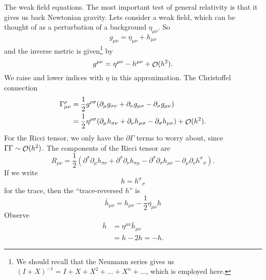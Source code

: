 
The weak field equations. The most important test of general
relativity is that it gives us back Newtonian gravity. Lets
consider a weak field, which can be thought of as a perturbation
of a background $\eta_{\mu\nu}$. So
\begin{equation}
g_{\mu\nu}=\eta_{\mu\nu}+h_{\mu\nu}
\end{equation}
and the inverse metric is given\footnote{We should recall that
  the Neumann series gives us
  $(I+X)^{-1}=I+X+X^{2}+\dots+X^{n}+\dots$, which is employed here.} by
\begin{equation}
g^{\mu\nu}=\eta^{\mu\nu}-h^{\mu\nu}+\mathop{\mathcal{O}}\nolimits(h^{2}).
\end{equation}
We raise and lower indices with $\eta$ in this approximation. The
Christoffel connection
\begin{equation}
\begin{split}
\Gamma^{\rho}_{\mu\nu}
&=\frac{1}{2}g^{\rho\sigma}(\partial_{\mu}g_{\sigma\nu}
+\partial_{\nu}g_{\mu\sigma}-\partial_{\sigma}g_{\mu\nu})\\
&=\frac{1}{2}\eta^{\rho\sigma}(\partial_{\mu}h_{\sigma\nu}
+\partial_{\nu}h_{\mu\sigma}-\partial_{\sigma}h_{\mu\nu})
+\mathop{\mathcal{O}}\nolimits(h^{2}).
\end{split}
\end{equation}
For the Ricci tensor, we only have the $\partial\Gamma$ terms to
worry about, since $\Gamma\Gamma\sim\mathop{\mathcal{O}}\nolimits(h^{2})$. The components
of the Ricci tensor are
\begin{equation}
R_{\mu\nu}=\frac{1}{2}(\partial^{\sigma}\partial_{\mu}h_{\sigma\nu}
+\partial^{\sigma}\partial_{\nu}h_{\sigma\mu}
-\partial^{\sigma}\partial_{\sigma}h_{\mu\nu}
-\partial_{\mu}\partial_{\nu}{h^{\sigma}}_{\sigma}).
\end{equation}
If we write
\begin{equation}
h={h^{\sigma}}_{\sigma}
\end{equation}
for the trace, then the ``trace-reversed $h$'' is
\begin{equation}
\bar{h}_{\mu\nu}=h_{\mu\nu}-\frac{1}{2}\eta_{\mu\nu}h
\end{equation}
Observe
\begin{equation}
\begin{split}
\bar{h}&=\eta^{\mu\nu}\bar{h}_{\mu\nu}\\
&=h-2h=-h.
\end{split}
\end{equation}
